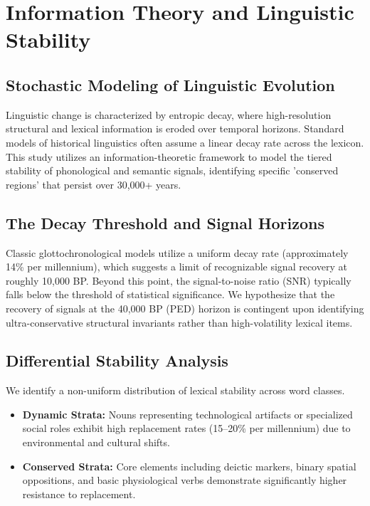 \chapter{Information Theory and Linguistic Stability}

\section{Stochastic Modeling of Linguistic Evolution}
Linguistic change is characterized by entropic decay, where high-resolution structural and lexical information is eroded over temporal horizons. Standard models of historical linguistics often assume a linear decay rate across the lexicon. This study utilizes an information-theoretic framework to model the tiered stability of phonological and semantic signals, identifying specific 'conserved regions' that persist over 30,000+ years.

\section{The Decay Threshold and Signal Horizons}
Classic glottochronological models utilize a uniform decay rate (approximately 14\% per millennium), which suggests a limit of recognizable signal recovery at roughly 10,000 BP. Beyond this point, the signal-to-noise ratio (SNR) typically falls below the threshold of statistical significance. We hypothesize that the recovery of signals at the 40,000 BP (PED) horizon is contingent upon identifying ultra-conservative structural invariants rather than high-volatility lexical items.

\section{Differential Stability Analysis}
We identify a non-uniform distribution of lexical stability across word classes. 
\begin{itemize}
    \item \textbf{Dynamic Strata:} Nouns representing technological artifacts or specialized social roles exhibit high replacement rates (15–20\% per millennium) due to environmental and cultural shifts.
    \item \textbf{Conserved Strata:} Core elements including deictic markers, binary spatial oppositions, and basic physiological verbs demonstrate significantly higher resistance to replacement.
\end{itemize}


